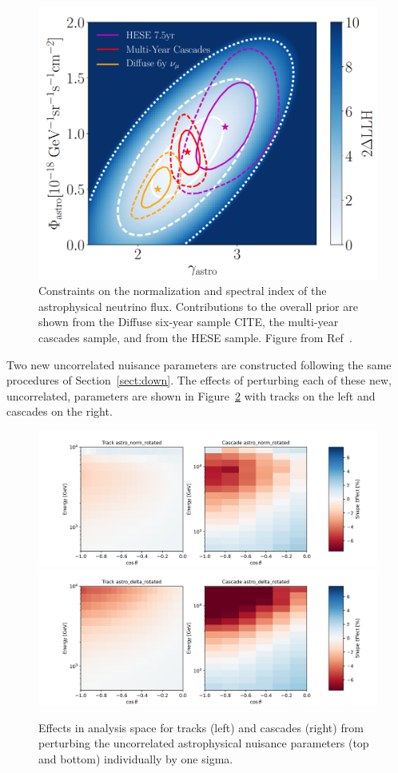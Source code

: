 \documentclass[main.tex]{subfiles}
\begin{document}
\begin{figure}
    \centering
    \includegraphics[width=0.6\linewidth]{figures/hese.png}
    \caption{Constraints on the normalization and spectral index of the astrophysical neutrino flux. Contributions to the overall prior are shown from the Diffuse six-year sample CITE, the multi-year cascades sample, and from the HESE sample. Figure from Ref~\cite{Aartsen_2020_prd}.}\label{fig:hese}
\end{figure}

Two new uncorrelated nuisance parameters are constructed following the same procedures of Section~\ref{sect:down}. The effects of perturbing each of these new, uncorrelated, parameters are shown in Figure~\ref{fig:recoastro} with tracks on the left and cascades on the right.

\begin{figure}
    \centering
    \includegraphics[width=0.8\linewidth]{figures/systematics/astro_norm_rotated.png}\\
    \includegraphics[width=0.8\linewidth]{figures/systematics/astro_delta_rotated.png}
    \caption{Effects in analysis space for tracks (left) and cascades (right) from perturbing the uncorrelated astrophysical nuisance parameters (top and bottom) individually by one sigma. }\label{fig:recoastro}
\end{figure}
\end{document}
